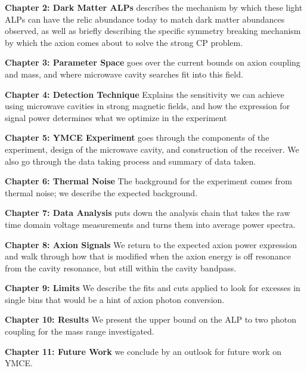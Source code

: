 \documentclass[12pt,twosides]{book}
\begin{document}
\textbf{Chapter 2: Dark Matter ALPs} describes the mechanism by which these light ALPs can have the relic abundance today to match dark matter abundances observed, as well as briefly describing the specific symmetry breaking mechanism by which the axion comes about to solve the strong CP problem.

\textbf{Chapter 3: Parameter Space} goes over the current bounds on axion coupling and mass, and where microwave cavity searches fit into this field.

\textbf{Chapter 4: Detection Technique} Explains the sensitivity we can achieve using microwave cavities in strong magnetic fields, and how the expression for signal power determines what we optimize in the experiment

\textbf{Chapter 5: YMCE Experiment} goes through the components of the experiment, design of the microwave cavity, and construction of the receiver. We also go through the data taking process and summary of data taken.

\textbf{Chapter 6: Thermal Noise} The background for the experiment comes from thermal noise; we describe the expected background.

\textbf{Chapter 7: Data Analysis} puts down the analysis chain that takes the raw time domain voltage measurements and turns them into average power spectra. 

\textbf{Chapter 8: Axion Signals} We return to the expected axion power expression and walk through how that is modified when the axion energy is off resonance from the cavity resonance, but still within the cavity bandpass.

\textbf{Chapter 9:  Limits} We describe the fits and cuts applied to look for excesses in single bins that would be a hint of axion photon conversion.

\textbf{Chapter 10: Results} We present the upper bound on the ALP to two photon coupling for the mass range investigated.

\textbf{Chapter 11: Future Work} we conclude by an outlook for future work on YMCE.



\end{document}
